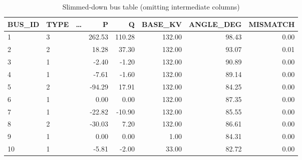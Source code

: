 \begin{table}
\centering
\caption{Slimmed‐down bus table (omitting intermediate columns)}
\label{tab:bus_slim}
\begin{tabular}{llcrrrrr}
\toprule
 BUS_ID &  TYPE & \dots &      P &      Q &  BASE_KV &  ANGLE_DEG &  MISMATCH \\
\midrule
      1 &     3 &       & 262.53 & 110.28 &   132.00 &      98.43 &      0.00 \\
      2 &     2 &       &  18.28 &  37.30 &   132.00 &      93.07 &      0.01 \\
      3 &     1 &       &  -2.40 &  -1.20 &   132.00 &      90.89 &      0.00 \\
      4 &     1 &       &  -7.61 &  -1.60 &   132.00 &      89.14 &      0.00 \\
      5 &     2 &       & -94.29 &  17.91 &   132.00 &      84.25 &      0.00 \\
      6 &     1 &       &   0.00 &   0.00 &   132.00 &      87.35 &      0.00 \\
      7 &     1 &       & -22.82 & -10.90 &   132.00 &      85.55 &      0.00 \\
      8 &     2 &       & -30.03 &   7.20 &   132.00 &      86.61 &      0.00 \\
      9 &     1 &       &   0.00 &   0.00 &     1.00 &      84.31 &      0.00 \\
     10 &     1 &       &  -5.81 &  -2.00 &    33.00 &      82.72 &      0.00 \\
\bottomrule
\end{tabular}
\end{table}
